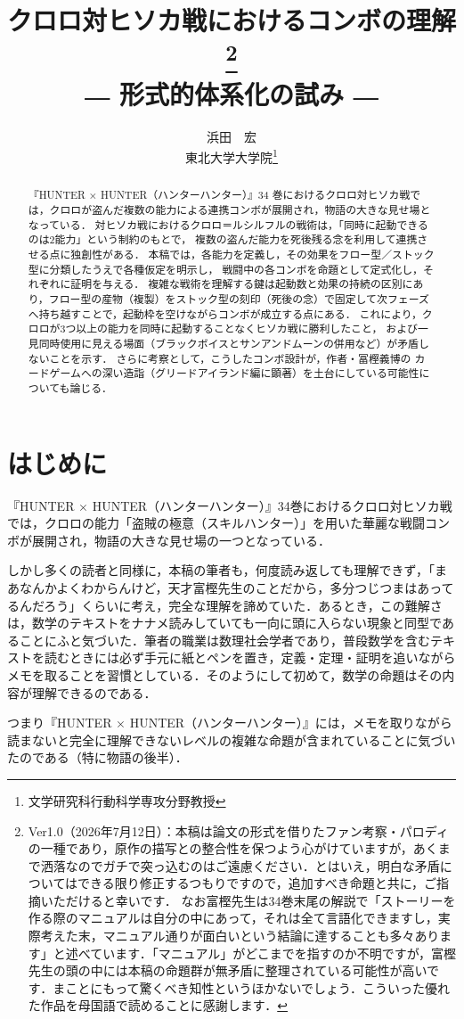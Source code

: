 \documentclass[a4paper,12pt]{jarticle}
\title{クロロ対ヒソカ戦におけるコンボの理解\footnote{Ver1.0（2026年7月12日）：本稿は論文の形式を借りたファン考察・パロディの一種であり，原作の描写との整合性を保つよう心がけていますが，あくまで洒落なのでガチで突っ込むのはご遠慮ください．とはいえ，明白な矛盾についてはできる限り修正するつもりですので，追加すべき命題と共に，ご指摘いただけると幸いです．
なお富樫先生は34巻末尾の解説で「ストーリーを作る際のマニュアルは自分の中にあって，それは全て言語化できますし，実際考えた末，マニュアル通りが面白いという結論に達することも多々あります」と述べています．「マニュアル」がどこまでを指すのか不明ですが，富樫先生の頭の中には本稿の命題群が無矛盾に整理されている可能性が高いです．まことにもって驚くべき知性というほかないでしょう．こういった優れた作品を母国語で読めることに感謝します．}\\
\large ― 形式的体系化の試み ―}
\author{浜田　宏\\東北大学大学院\footnote{文学研究科行動科学専攻分野教授}}
\date{}
\theoremstyle{definition}
\theoremstyle{plain}
\theoremstyle{definition}
\theoremstyle{remark}
\begin{document}
\maketitle

\begin{abstract}
 『HUNTER × HUNTER（ハンターハンター）』34 巻におけるクロロ対ヒソカ戦では，クロロが盗んだ複数の能力による連携コンボが展開され，物語の大きな見せ場となっている． 
対ヒソカ戦におけるクロロ＝ルシルフルの戦術は，「同時に起動できるのは2能力」という制約のもとで，
複数の盗んだ能力を死後残る念を利用して連携させる点に独創性がある．
本稿では，各能力を定義し，その効果をフロー型／ストック型に分類したうえで各種仮定を明示し，
戦闘中の各コンボを命題として定式化し，それぞれに証明を与える．
複雑な戦術を理解する鍵は起動数と効果の持続の区別にあり，フロー型の産物（複製）をストック型の刻印（死後の念）で固定して次フェーズへ持ち越すことで，起動枠を空けながらコンボが成立する点にある．
これにより，クロロが3つ以上の能力を同時に起動することなくヒソカ戦に勝利したこと，
および一見同時使用に見える場面（ブラックボイスとサンアンドムーンの併用など）が矛盾しないことを示す．
さらに考察として，こうしたコンボ設計が，作者・冨樫義博の
カードゲームへの深い造詣（グリードアイランド編に顕著）を土台にしている可能性についても論じる．
\end{abstract}

\bigskip


\section*{はじめに}
『HUNTER $\times$ HUNTER（ハンターハンター）』34巻におけるクロロ対ヒソカ戦では，クロロの能力「盗賊の極意（スキルハンター）」を用いた華麗な戦闘コンボが展開され，物語の大きな見せ場の一つとなっている．

しかし多くの読者と同様に，本稿の筆者も，何度読み返しても理解できず，「まあなんかよくわからんけど，天才富樫先生のことだから，多分つじつまはあってるんだろう」くらいに考え，完全な理解を諦めていた．あるとき，この難解さは，数学のテキストをナナメ読みしていても一向に頭に入らない現象と同型であることにふと気づいた．筆者の職業は数理社会学者であり，普段数学を含むテキストを読むときには必ず手元に紙とペンを置き，定義・定理・証明を追いながらメモを取ることを習慣としている．そのようにして初めて，数学の命題はその内容が理解できるのである．

つまり『HUNTER $\times$ HUNTER（ハンターハンター）』には，メモを取りながら読まないと完全に理解できないレベルの複雑な命題が含まれていることに気づいたのである（特に物語の後半）．
\end{document}
